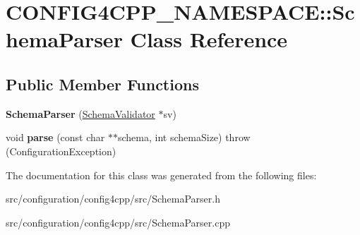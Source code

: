 \hypertarget{classCONFIG4CPP__NAMESPACE_1_1SchemaParser}{\section{C\-O\-N\-F\-I\-G4\-C\-P\-P\-\_\-\-N\-A\-M\-E\-S\-P\-A\-C\-E\-:\-:Schema\-Parser Class Reference}
\label{classCONFIG4CPP__NAMESPACE_1_1SchemaParser}
}
\subsection*{Public Member Functions}
\begin{DoxyCompactItemize}
\item 
\hypertarget{classCONFIG4CPP__NAMESPACE_1_1SchemaParser_a0ea76efcbf6e58cd6adc32011ac973a9}{{\bfseries Schema\-Parser} (\hyperlink{classCONFIG4CPP__NAMESPACE_1_1SchemaValidator}{Schema\-Validator} $\ast$sv)}\label{classCONFIG4CPP__NAMESPACE_1_1SchemaParser_a0ea76efcbf6e58cd6adc32011ac973a9}

\item 
\hypertarget{classCONFIG4CPP__NAMESPACE_1_1SchemaParser_ae6931178354fc66e3d4a977d43d43a68}{void {\bfseries parse} (const char $\ast$$\ast$schema, int schema\-Size)  throw (\-Configuration\-Exception)}\label{classCONFIG4CPP__NAMESPACE_1_1SchemaParser_ae6931178354fc66e3d4a977d43d43a68}

\end{DoxyCompactItemize}


The documentation for this class was generated from the following files\-:\begin{DoxyCompactItemize}
\item 
src/configuration/config4cpp/src/Schema\-Parser.\-h\item 
src/configuration/config4cpp/src/Schema\-Parser.\-cpp\end{DoxyCompactItemize}
